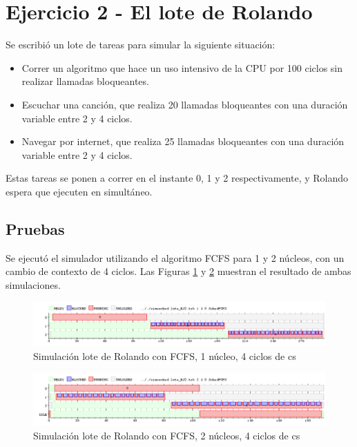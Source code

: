 \section{Ejercicio 2 - El lote de Rolando}

Se escribió un lote de tareas para simular la siguiente situación:

\begin{itemize}
	\item Correr un algoritmo que hace un uso intensivo de la CPU por 100 ciclos sin realizar llamadas bloqueantes.
	\item Escuchar una canción, que realiza 20 llamadas bloqueantes con una duración variable entre 2 y 4 ciclos.
	\item Navegar por internet, que realiza 25 llamadas bloqueantes con una duración variable entre 2 y 4 ciclos.
\end{itemize}

Estas tareas se ponen a correr en el instante 0, 1 y 2 respectivamente, y Rolando espera que ejecuten en simultáneo.

\subsection{Pruebas}

Se ejecutó el simulador utilizando el algoritmo FCFS para 1 y 2 núcleos, con un cambio de contexto de 4 ciclos.  Las Figuras \ref{fig-rol1core} y \ref{fig-rol2core} muestran el resultado de ambas simulaciones.

\begin{figure}[!htb]
\begin{center}
  \includegraphics[scale=0.45]{imagenes/ej2-1core.png}
\end{center}
\caption{Simulación lote de Rolando con FCFS, 1 núcleo, 4 ciclos de cs}\label{fig-rol1core}
\end{figure}

\begin{figure}[!htb]
\begin{center}
  \includegraphics[scale=0.45]{imagenes/ej2-2core.png}
\end{center}
\caption{Simulación lote de Rolando con FCFS, 2 núcleos, 4 ciclos de cs}\label{fig-rol2core}
\end{figure}

